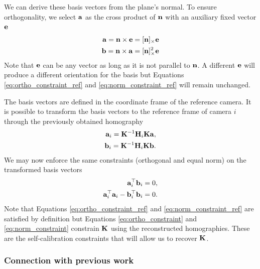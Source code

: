 \documentclass[10pt,twocolumn,letterpaper]{article}
\begin{document}
We can derive these basis vectors from the plane's normal. To ensure orthogonality, we select $\mathbf{a}$ as the cross product of $\mathbf{n}$ with an auxiliary fixed vector $\mathbf{e}$
\begin{align}
\mathbf{a} = \mathbf{n} \times \mathbf{e} = [\mathbf{n}]_\times \mathbf{e} \\
\mathbf{b} = \mathbf{n} \times \mathbf{a} = [\mathbf{n}]_\times^2 \mathbf{e}
\end{align}
Note that $\mathbf{e}$ can be any vector as long as it is not parallel to $\mathbf{n}$. A different $\mathbf{e}$ will produce a different orientation for the basis but Equations \eqref{eq:ortho_constraint_ref} and \eqref{eq:norm_constraint_ref} will remain unchanged.

The basis vectors are defined in the coordinate frame of the reference camera. It is possible to transform the basis vectors to the reference frame of camera $i$ through the previously obtained homography
\begin{align}
\mathbf{a}_i = \mathbf{K}^{-1} \mathbf{H}_i \mathbf{K} \mathbf{a}, \\
\mathbf{b}_i = \mathbf{K}^{-1} \mathbf{H}_i \mathbf{K} \mathbf{b}.
\end{align}
%
We may now enforce the same constraints (orthogonal and equal norm) on the transformed basis vectors
\begin{align}
\mathbf{a}_i^\top \mathbf{b}_i = 0, \label{eq:ortho_constraint} \\
\mathbf{a}_i^\top \mathbf{a}_i - \mathbf{b}_i^\top \mathbf{b}_i = 0. \label{eq:norm_constraint} 
\end{align}
%
Note that Equations \eqref{eq:ortho_constraint_ref} and \eqref{eq:norm_constraint_ref} are satisfied by definition but Equations \eqref{eq:ortho_constraint} and \eqref{eq:norm_constraint} constrain $\mathbf{K}$ using the reconstructed homographies. These are the self-calibration constraints that will allow us to recover $\mathbf{K}$.

\subsubsection{Connection with previous work}
\end{document}
